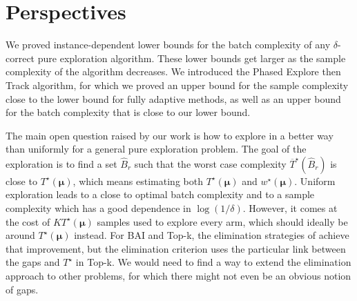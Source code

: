 
\section{Perspectives}

We proved instance-dependent lower bounds for the batch complexity of any $\delta$-correct pure exploration algorithm.
These lower bounds get larger as the sample complexity of the algorithm decreases.
We introduced the Phased Explore then Track algorithm, for which we proved an upper bound for the sample complexity close to the lower bound for fully adaptive methods, as well as an upper bound for the batch complexity that is close to our lower bound.

The main open question raised by our work is how to explore in a better way than uniformly for a general pure exploration problem.
The goal of the exploration is to find a set $\hat{B}_r$ such that the worst case complexity $\overline{T}^\star(\hat{B}_r)$ is close to $T^\star(\bm\mu)$, which means estimating both $T^\star(\bm\mu)$ and $w^\star(\bm\mu)$.
Uniform exploration leads to a close to optimal batch complexity and to a sample complexity which has a good dependence in $\log(1/\delta)$.
However, it comes at the cost of $K T^\star(\bm\mu)$ samples used to explore every arm, which should ideally be around $T^\star(\bm\mu)$ instead.
For BAI and Top-k, the elimination strategies of \citep{hillelDistributedExplorationMultiArmed2013,jinOptimalBatchedBest2023} achieve that improvement, but the elimination criterion uses the particular link between the gaps and $T^\star$ in Top-k.
We would need to find a way to extend the elimination approach to other problems, for which there might not even be an obvious notion of gaps.
